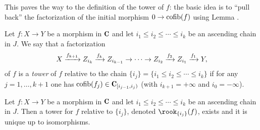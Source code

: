 \documentclass[a4paper,12pt]{amsart}
\begin{document}
This paves the way to the definition of the tower of $f$: the basic idea is to ``pull back'' the factorization of the initial morphism $0\to \operatorname{cofib}(f)$ using Lemma .
\begin{definition} \label{tower.of.f}Let $f\colon X\to Y$ be a morphism in $\C$ and let $i_1\leq i_2\leq\cdots \leq i_k$ be an ascending chain in $J$. We say that a factorization 
\[
X \xrightarrow{f_{k+1}} Z_{i_k} \xrightarrow{f_k}Z_{i_{k-1}}\to\dots\to Z_{i_{2}} \xrightarrow{f_2} Z_{i_1} \xrightarrow{f_1} Y,
\]
of $f$ is a \emph{tower} of $f$ relative to the chain $\{i_j\} = \{i_1\leq i_2\leq\cdots \leq i_k\}$ if for any $j=1,\dots,k+1$ one has
$\cofib(f_j)\in \C_{[i_{j-1},i_j)}$ (with $i_{k+1}=+\infty$ and $i_0=-\infty$).
\end{definition}
\begin{proposition}\label{prop:perPostnikov} 
Let $f\colon X\to Y$ be a morphism in $\C$ and let $i_1\leq i_2\leq\cdots \leq i_k$ be an ascending chain in $J$. Then a tower for $f$ relative to $\{i_j\}$, denoted $\rook_{\{i_j\}}(f)$, exists and it is unique up to isomorphisms.
\end{proposition}
\end{document}
